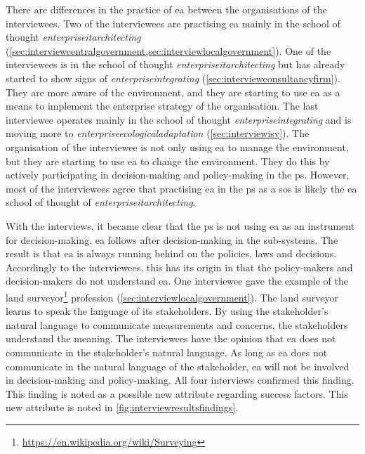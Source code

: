 There are differences in the practice of \acrshort{ea} between the organisations of the interviewees. Two of the interviewees are practising \acrshort{ea} mainly in the school of thought \textit{\gls{enterpriseitarchitecting}} (\cref{sec:interviewcentralgovernment,sec:interviewlocalgovernment}). One of the interviewees is in the school of thought \textit{\gls{enterpriseitarchitecting}} but has already started to show signs of \textit{\gls{enterpriseintegrating}} (\cref{sec:interviewconsultancyfirm}). They are more aware of the environment, and they are starting to use \acrshort{ea} as a means to implement the enterprise strategy of the organisation. The last interviewee operates mainly in the school of thought \textit{\gls{enterpriseintegrating}} and is moving more to \textit{\gls{enterpriseecologicaladaptation}} (\cref{sec:interviewisv}). The organisation of the interviewee is not only using \acrshort{ea} to manage the environment, but they are starting to use \acrshort{ea} to change the environment. They do this by actively participating in decision-making and policy-making in the \gls{ps}. However, most of the interviewees agree that practising \acrshort{ea} in the \gls{ps} as a \acrlong{sos} is likely the \acrshort{ea} school of thought of \textit{\gls{enterpriseitarchitecting}}.

With the interviews, it became clear that the \gls{ps} is not using \acrshort{ea} as an instrument for decision-making. \acrshort{ea} follows after decision-making in the sub-systems. The result is that \acrshort{ea} is always running behind on the policies, laws and decisions. Accordingly to the interviewees, this has its origin in that the policy-makers and decision-makers do not understand \acrshort{ea}. One interviewee gave the example of the land surveyor\footnote{\url{https://en.wikipedia.org/wiki/Surveying}} profession (\cref{sec:interviewlocalgovernment}). The land surveyor learns to speak the language of its stakeholders. By using the stakeholder's natural language to communicate measurements and concerns, the stakeholders understand the meaning. The interviewees have the opinion that \acrshort{ea} does not communicate in the stakeholder's natural language. As long as \acrshort{ea} does not communicate in the natural language of the stakeholder, \acrshort{ea} will not be involved in decision-making and policy-making. All four interviews confirmed this finding. This finding is noted as a possible new \gls{attribute} regarding success factors. This new \gls{attribute} is noted in \cref{fig:interviewresultsfindings}.
